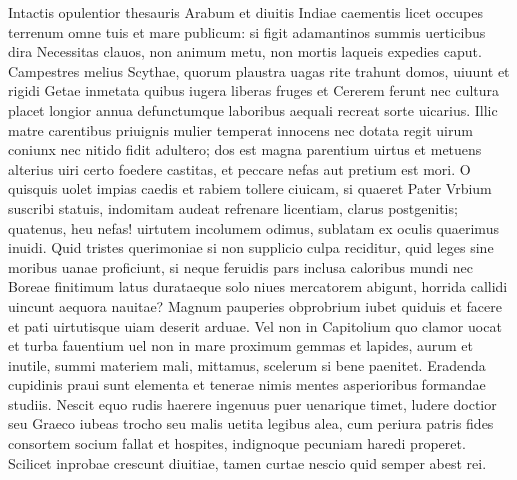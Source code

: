 \documentclass{book}
\newenvironment {carmen} [1] [\relax] 
  {\Titulus \Versus \incipit*\numerus{1}#1}
  {\endVersus}
\newcommand {\GlycAscl}  {\Forma \strophae {2 \poena 0}}
\begin{document}
\begin{carmen}[\GlycAscl]


     Intactis opulentior
 thesauris Arabum et diuitis Indiae
      caementis licet occupes
 terrenum omne tuis et mare publicum:
      si figit adamantinos               
 summis uerticibus dira Necessitas
      clauos, non animum metu,
 non mortis laqueis expedies caput.
      Campestres melius Scythae,
 quorum plaustra uagas rite trahunt domos,               
      uiuunt et rigidi Getae
 inmetata quibus iugera liberas
      fruges et Cererem ferunt
 nec cultura placet longior annua
      defunctumque laboribus               
 aequali recreat sorte uicarius.
      Illic matre carentibus
 priuignis mulier temperat innocens
      nec dotata regit uirum
 coniunx nec nitido fidit adultero;               
      dos est magna parentium
 uirtus et metuens alterius uiri
      certo foedere castitas,
 et peccare nefas aut pretium est mori.
      O quisquis uolet impias               
 caedis et rabiem tollere ciuicam,
      si quaeret Pater Vrbium
 suscribi statuis, indomitam audeat
      refrenare licentiam,
 clarus postgenitis; quatenus, heu nefas!               
      uirtutem incolumem odimus,
 sublatam ex oculis quaerimus inuidi.
      Quid tristes querimoniae
 si non supplicio culpa reciditur,
      quid leges sine moribus               
 uanae proficiunt, si neque feruidis
      pars inclusa caloribus
 mundi nec Boreae finitimum latus
      durataeque solo niues
 mercatorem abigunt, horrida callidi               
      uincunt aequora nauitae?
 Magnum pauperies obprobrium iubet
      quiduis et facere et pati
 uirtutisque uiam deserit arduae.
      Vel non in Capitolium               
 quo clamor uocat et turba fauentium
      uel non in mare proximum
 gemmas et lapides, aurum et inutile,
      summi materiem mali,
 mittamus, scelerum si bene paenitet.               
      Eradenda cupidinis
 praui sunt elementa et tenerae nimis
      mentes asperioribus
 formandae studiis. Nescit equo rudis
      haerere ingenuus puer               
 uenarique timet, ludere doctior
      seu Graeco iubeas trocho
 seu malis uetita legibus alea,
      cum periura patris fides
 consortem socium fallat et hospites,               
      indignoque pecuniam
 haredi properet. Scilicet inprobae
      crescunt diuitiae, tamen
 curtae nescio quid semper abest rei. 

\end{carmen}
\end{document}
